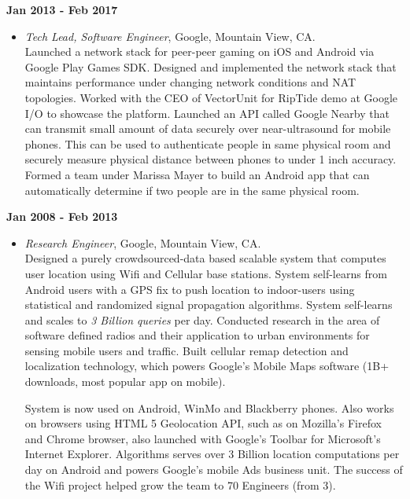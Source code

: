 \begin{resume}
{\bf Jan 2013 - Feb 2017}
    \begin{itemize}
         \item[] {\it Tech Lead, Software Engineer}, Google, Mountain View, CA.\\

             Launched a network stack for peer-peer gaming on iOS and Android via Google Play Games SDK. Designed and
             implemented the network stack that maintains performance under changing network conditions and NAT
             topologies. Worked with the CEO of VectorUnit for RipTide demo at Google I/O to showcase the platform.
             Launched an API called Google Nearby that can transmit small amount of data securely over near-ultrasound
             for mobile phones. This can be used to authenticate people in same physical room and securely measure physical distance
             between phones to under 1 inch accuracy.
             Formed a team under Marissa Mayer to build an Android app that can automatically determine if two people
             are in the same physical room.
    \end{itemize}

{\bf Jan 2008 - Feb 2013}
    \begin{itemize}
         \item[] {\it Research Engineer}, Google, Mountain View, CA.\\

             Designed a purely crowdsourced-data based scalable system that computes user location using Wifi and Cellular base
             stations. System self-learns from Android users with a GPS fix to push location to indoor-users using
             statistical and randomized signal propagation algorithms.  System self-learns and scales to {\em 3 Billion
             queries} per day.
	 Conducted research in the area of software defined radios and
	 their application to urban environments for sensing mobile users and
	 traffic. Built cellular remap detection and localization technology, which
	 powers Google's Mobile Maps software (1B+ downloads, most popular
	 app on mobile).
	 
	 System is now used on Android, WinMo and Blackberry phones. Also works on browsers using HTML 5 Geolocation API, such
	 as on Mozilla's Firefox and Chrome browser, also launched with Google's Toolbar for Microsoft's Internet Explorer.
            Algorithms serves over 3 Billion location computations per day on Android and powers Google's mobile Ads
            business unit. The success of the Wifi project helped grow the team to 70 Engineers (from 3).


\end{itemize}
\end{resume}
